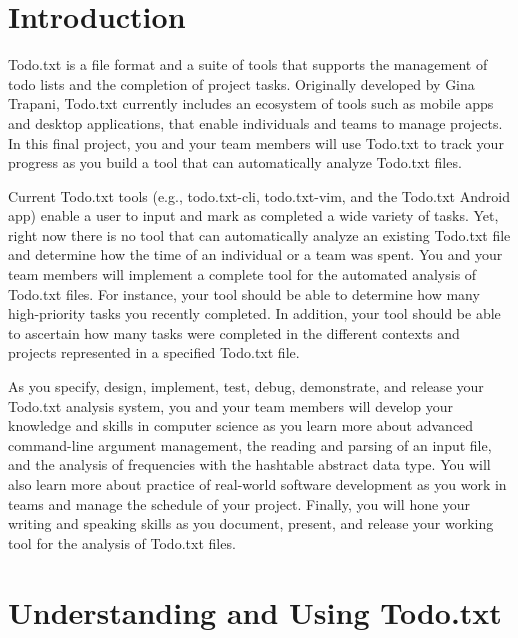 


\usepackage[compact]{titlesec}


\section*{Introduction}

Todo.txt is a file format and a suite of tools that supports the management of todo lists and the completion of project
tasks. Originally developed by Gina Trapani, Todo.txt currently includes an ecosystem of tools such as mobile apps and
desktop applications, that enable individuals and teams to manage projects. In this final project, you and your team
members will use Todo.txt to track your progress as you build a tool that can automatically analyze Todo.txt files.

Current Todo.txt tools (e.g., todo.txt-cli, todo.txt-vim, and the Todo.txt Android app) enable a user to input and mark
as completed a wide variety of tasks.  Yet, right now there is no tool that can automatically analyze an existing
Todo.txt file and determine how the time of an individual or a team was spent. You and your team members will implement
a complete tool for the automated analysis of Todo.txt files.  For instance, your tool should be able to determine how
many high-priority tasks you recently completed.  In addition, your tool should be able to ascertain how many tasks were
completed in the different contexts and projects represented in a specified Todo.txt file. 

As you specify, design, implement, test, debug, demonstrate, and release your Todo.txt analysis system, you and your
team members will develop your knowledge and skills in computer science as you learn more about advanced command-line
argument management, the reading and parsing of an input file, and the analysis of frequencies with the hashtable
abstract data type. You will also learn more about practice of real-world software development as you work in teams and
manage the schedule of your project. Finally, you will hone your writing and speaking skills as you document, present,
and release your working tool for the analysis of Todo.txt files.

\section*{Understanding and Using Todo.txt}

